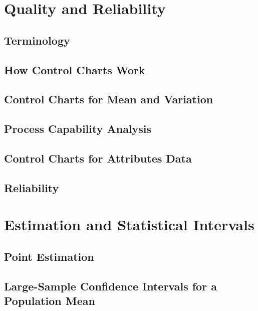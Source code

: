 \documentclass{article}
\begin{document}
\section{Quality and Reliability} %

	\subsection{Terminology} %
	
	\subsection{How Control Charts Work} %
	
	\subsection{Control Charts for Mean and Variation} %
	
	\subsection{Process Capability Analysis} %
	
	\subsection{Control Charts for Attributes Data} %
	
	\subsection{Reliability} %

\clearpage	
\section{Estimation and Statistical Intervals} %

	\subsection{Point Estimation} %
	
	\subsection{Large-Sample Confidence Intervals for a Population Mean} %
	
\end{document}
